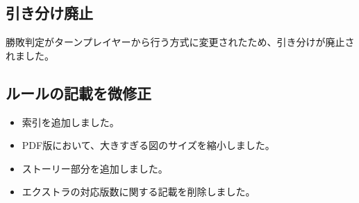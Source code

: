 \documentclass[letterpaper,10pt,dvipdfmx]{sphinxmanual}
\begin{document}
\subsection{引き分け廃止}
\label{\detokenize{revision-history/7th:id6}}
\sphinxAtStartPar
勝敗判定がターンプレイヤーから行う方式に変更されたため、引き分けが廃止されました。


\subsection{ルールの記載を微修正}
\label{\detokenize{revision-history/7th:id7}}\begin{itemize}
\item {} 
\sphinxAtStartPar
索引を追加しました。

\item {} 
\sphinxAtStartPar
PDF版において、大きすぎる図のサイズを縮小しました。

\item {} 
\sphinxAtStartPar
ストーリー部分を追加しました。

\item {} 
\sphinxAtStartPar
エクストラの対応版数に関する記載を削除しました。

\end{itemize}



\renewcommand{\indexname}{索引}
\printindex
\end{document}
